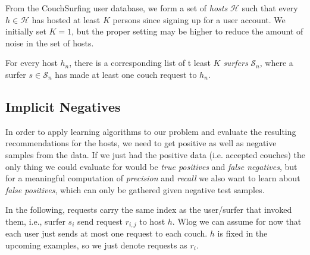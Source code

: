 From the CouchSurfing user database, we form a set of \emph{hosts} $\mathcal{H}$ such that every $h \in \mathcal{H}$ has hosted at least $K$ persons since signing up for a user account.
We initially set $K=1$, but the proper setting may be higher to reduce the amount of noise in the set of hosts.

For every host $h_n$, there is a corresponding list of t least $K$ \emph{surfers} $\mathcal{S}_n$, where a surfer $s \in \mathcal{S}_n$ has made at least one couch request to $h_n$.

\subsection{Implicit Negatives}
\label{sec:implicitNeg}
In order to apply learning algorithms to our problem and evaluate the resulting recommendations for the hosts, we need to get positive as well as negative samples from the data. If we just had the positive data (i.e. accepted couches) the only thing we could evaluate for would be \textit{true positives} and \textit{false negatives}, but for a meaningful computation of \textit{precision} and \textit{recall} we also want to learn about \textit{false positives}, which can only be gathered given negative test samples.

In the following, requests carry the same index as the user/surfer that invoked them, i.e., surfer $s_i$ send request $r_{i,j}$ to host $h$. Wlog we can assume for now that each user just sends at most one request to each couch. $h$ is fixed in the upcoming examples, so we just denote requests as $r_i$.
 
